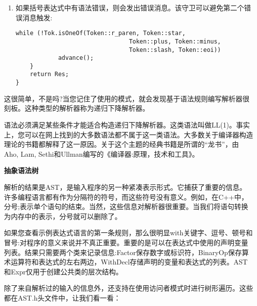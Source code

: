 \begin{enumerate}
\item 如果括号表达式中有语法错误，则会发出错误消息。该守卫可以避免第二个错误消息触发:
\begin{lstlisting}[caption={}]
			while (!Tok.isOneOf(Token::r_paren, Token::star,
								Token::plus, Token::minus,
								Token::slash, Token::eoi))
			advance();
	}
	return Res;
}
\end{lstlisting}

\end{enumerate}

这很简单，不是吗?当您记住了使用的模式，就会发现基于语法规则编写解析器很刻板。这种类型的解析器称为递归下降解析器。

\begin{tcolorbox}[colback=blue!5!white,colframe=blue!75!black, title=递归下降解析器不能适配所有语法]
语法必须满足某些条件才能适合构造递归下降解析器。这类语法叫做LL(1)。事实上，您可以在网上找到的大多数语法都不属于这一类语法。大多数关于编译器构造理论的书籍都解释了这一原因。关于这个主题的经典书籍是所谓的“龙书”，由Aho, Lam, Sethi和Ullman编写的《编译器:原理，技术和工具》。
\end{tcolorbox}


\hspace*{\fill} \par %
\textbf{抽象语法树}

解析的结果是AST，是输入程序的另一种紧凑表示形式。它捕获了重要的信息。许多编程语言都有作为分隔符的符号，而这些符号没有意义。例如，在C++中，分号;表示单个语句的结束。当然，这些信息对解析器很重要。当我们将语句转换为内存中的表示，分号就可以删除了。\par

如果您查看示例表达式语言的第一条规则，那么很明显with关键字、逗号、顿号和冒号:对程序的意义来说并不真正重要。重要的是可以在表达式中使用的声明变量列表。结果只需要两个类来记录信息:Factor保存数字或标识符，BinaryOp保存算术运算符和表达式的左右两边，WithDecl存储声明的变量和表达式的列表。AST和Expr仅用于创建公共类的层次结构。\par

除了来自解析过的输入的信息外，还支持在使用访问者模式时进行树形遍历。这些都在AST.h头文件中，让我们看一看：\par


